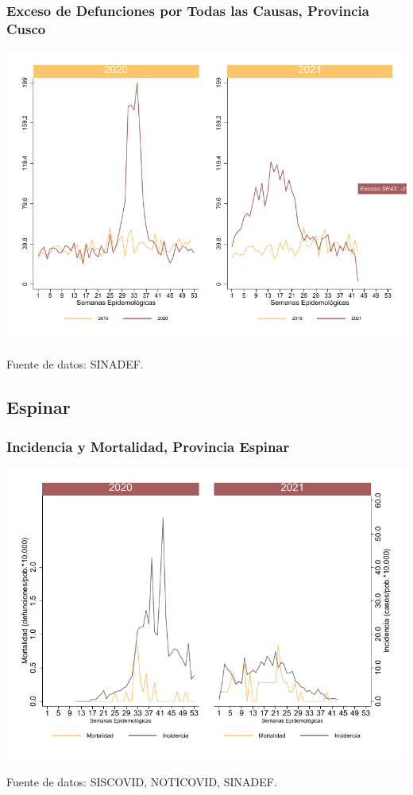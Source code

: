 \documentclass[xcolor=table]{beamer}
\begin{document}
\begin{frame}
	\frametitle{Exceso de Defunciones por Todas las Causas, Provincia Cusco}
	\vspace{-.5cm}
	\begin{center}
		\includegraphics[width=0.8\linewidth, trim={0cm .5cm 0cm 0.2cm},clip]{../figuras/exceso_7.pdf}
	\end{center}
	{\tiny Fuente de datos: SINADEF.}
	
	\hyperlink{indicadores_provinciales}{}
\end{frame}

\subsection{Espinar}

\begin{frame}[label=Espinar]
	\frametitle{Incidencia y Mortalidad, Provincia Espinar}
	\vspace{-.5cm}
	\begin{center}
		\includegraphics[width=0.8\linewidth, trim={0cm .5cm 0cm 0.2cm},clip]{../figuras/incidencia_mortalidad_20_21_8.pdf}
	\end{center}
	{\tiny Fuente de datos: SISCOVID, NOTICOVID, SINADEF.}
\end{frame}
\end{document}
